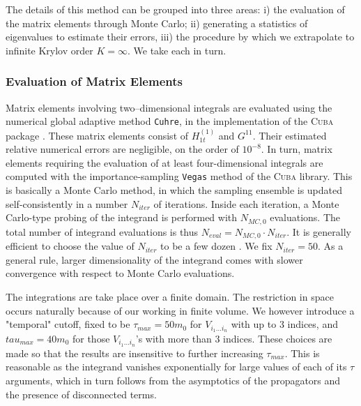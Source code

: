 \documentclass[twocolumn,secnumarabic,amssymb, nobibnotes, aps, prd]{revtex4-2}
\begin{document}
The details of this method can be grouped into three areas: i) the evaluation of the matrix elements through Monte Carlo; 
ii) generating a statistics of eigenvalues to estimate their errors,
iii) the procedure by which we extrapolate to infinite Krylov order $K=\infty$.  
We take each in turn.

\subsubsection{Evaluation of Matrix Elements} \label{MCMatelSection}

Matrix elements involving two--dimensional integrals are evaluated using the numerical global adaptive method \texttt{Cuhre}, in the implementation of the \textsc{Cuba} package \cite{Hahn:2004fe}. These matrix elements consist of $H_{1t}^{(1)}$ and $G^{11}$. Their estimated relative numerical errors are negligible, on the order of $10^{-8}$. In turn, matrix elements requiring the evaluation of at least four-dimensional integrals are computed with the importance-sampling \texttt{Vegas} method of the \textsc{Cuba} library. This is basically a Monte Carlo method, in which the sampling ensemble is updated self-consistently in a number $N_{iter}$ of iterations. Inside each iteration, a Monte Carlo-type probing of the integrand is performed with $N_{MC,0}$ evaluations. The total number of integrand evaluations is thus $N_{eval}=N_{MC,0}\cdot N_{iter}$. It is generally efficient to choose the value of $N_{iter}$ to be a few dozen \cite{Lepage:2020tgj}. We fix $N_{iter}=50$. As a general rule, larger dimensionality of the integrand comes with slower convergence with respect to Monte Carlo evaluations. 

The integrations are take place over a finite domain. The restriction in space occurs naturally because of our working in finite volume.  We however introduce  a "temporal" cutoff, fixed to be $\tau_{max}=50m_0$ for $V_{i_1\dots i_n}$  with up to $3$ indices, and $tau_{max}=40m_0$ for those $V_{i_1\dots i_n}$'s with more than $3$ indices. These choices are made so that the results are insensitive to further increasing $\tau_{max}$. This is reasonable as the integrand vanishes exponentially for large values of each of its $\tau$ arguments, which in turn follows from the asymptotics of the propagators and the presence of disconnected terms. 
\end{document}
